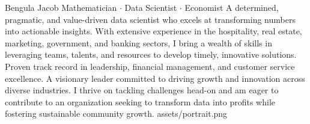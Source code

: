 \documentclass[theme]{cv_einstein}
\begin{document}
    \header
    {Bengula Jacob}
    {Mathematician $\cdot$ Data Scientist $\cdot$ Economist}
    {
        A determined, pragmatic, and value-driven data scientist who excels at transforming numbers into actionable insights. With extensive experience in the hospitality, real estate, marketing, government, and banking sectors, I bring a wealth of skills in leveraging teams, talents, and resources to develop timely, innovative solutions. Proven track record in leadership, financial management, and customer service excellence. A visionary leader committed to driving growth and innovation across diverse industries. I thrive on tackling challenges head-on and am eager to contribute to an organization seeking to transform data into profits while fostering sustainable community growth.%
    }
    {assets/portrait.png}


    \vspace{\headerheight} %
\end{document}
